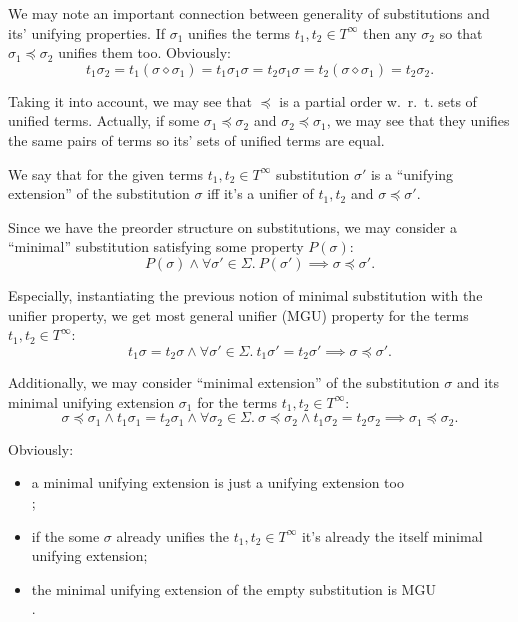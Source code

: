 We may note an important connection between generality of substitutions and its' unifying properties. If $\sigma_1$ unifies the terms $t_1, t_2 \in T^\infty$ then any $\sigma_2$ so that $\sigma_1 \preceq \sigma_2$ unifies them too. Obviously:
\[t_1 \sigma_2 = t_1 (\sigma \diamond \sigma_1) = t_1 \sigma_1 \sigma = t_2 \sigma_1 \sigma = t_2 (\sigma \diamond \sigma_1) = t_2 \sigma_2.\]

Taking it into account, we may see that $\preceq$ is a partial order w.~r.~t. sets of unified terms. Actually, if some $\sigma_1 \preceq \sigma_2$ and $\sigma_2 \preceq \sigma_1$, we may see that they unifies the same pairs of terms so its' sets of unified terms are equal.

We say that for the given terms $t_1, t_2 \in T^\infty$ substitution $\sigma'$ is a ``unifying extension'' of the substitution $\sigma$ iff it's a unifier of $t_1, t_2$ and $\sigma \preceq \sigma'$.

Since we have the preorder structure on substitutions, we may consider a ``minimal'' substitution satisfying some property $P(\sigma)$:
\[P(\sigma) \land \forall \sigma' \in \Sigma. ~ P(\sigma') \implies \sigma \preceq \sigma'.\]

Especially, instantiating the previous notion of minimal substitution with the unifier property, we get most general unifier (MGU) property for the terms $t_1, t_2 \in T^\infty$:
\[t_1 \sigma = t_2 \sigma \land \forall \sigma' \in \Sigma. ~ 
t_1 \sigma' = t_2 \sigma' \implies \sigma \preceq \sigma'.\]

Additionally, we may consider ``minimal extension'' of the substitution $\sigma$ and its minimal unifying extension $\sigma_1$ for the terms $t_1, t_2 \in T^\infty$:
\[\sigma \preceq \sigma_1 \land t_1 \sigma_1 = t_2 \sigma_1 \land \forall \sigma_2 \in \Sigma. ~ \sigma \preceq \sigma_2 \land t_1 \sigma_2 = t_2 \sigma_2 \implies \sigma_1 \preceq \sigma_2.\]

Obviously:
\begin{itemize}
    \item a minimal unifying extension is just a unifying extension too \\
    ;
    \item if the some $\sigma$ already unifies the $t_1, t_2 \in T^\infty$ it's already the itself minimal unifying extension;
    \item the minimal unifying extension of the empty substitution is MGU \\ .
\end{itemize}

